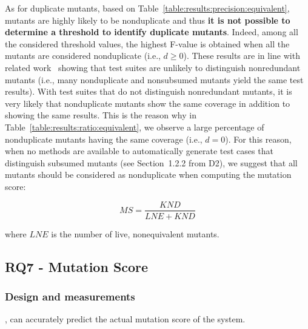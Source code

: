 As for duplicate mutants, based on Table~\ref{table:results:precision:equivalent}, 
mutants are highly likely to be nonduplicate and thus \textbf{it is not possible to determine a threshold to identify duplicate mutants}. Indeed, among all the considered threshold values, the highest F-value is obtained when all the mutants are considered nonduplicate (i.e., $d\ge0$). These results are in line with related work~\cite{shin2017theoretical} showing that test suites are unlikely to distinguish nonredundant mutants (i.e., many nonduplicate and nonsubsumed mutants yield the same test results). 
With test suites that do not distinguish nonredundant mutants, it is very likely that nonduplicate mutants show the same coverage in addition to showing the same results. This is the reason why in Table~\ref{table:results:ratio:equivalent}, we observe a large percentage of nonduplicate mutants having the same coverage (i.e., $d=0$). For this reason, when no methods are available to automatically generate test cases that distinguish subsumed mutants (see Section~1.2.2 from D2), we suggest that all mutants should be considered as nonduplicate when computing the mutation score:

\begin{equation}
\label{equation:ms:exp}
\mathit{MS} = \frac{\mathit{KND}}{\mathit{LNE}+\mathit{KND}}
\end{equation}

where $\mathit{LNE}$ is the number of live, nonequivalent mutants.







\subsection{RQ7 - \APPR Mutation Score}

\subsubsection{Design and measurements}

,
can accurately predict
the actual mutation score of the system.

